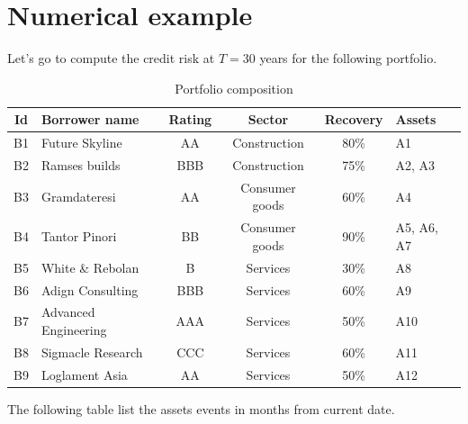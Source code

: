 \documentclass[a4paper,12pt,final]{article}
\begin{document}
\section{Numerical example}

Let's go to compute the credit risk at $T=30$ years for the following portfolio.

\begin{table}[!hb]
\begin{center}
\begin{tabular}[]{c|l|c|c|c|l}
Id  & Borrower name        & Rating & Sector         & Recovery & Assets     \\
\hline
B1  & Future Skyline       & AA     & Construction   & 80\%     & A1         \\
B2  & Ramses builds        & BBB    & Construction   & 75\%     & A2, A3     \\
B3  & Gramdateresi         & AA     & Consumer goods & 60\%     & A4         \\
B4  & Tantor Pinori        & BB     & Consumer goods & 90\%     & A5, A6, A7 \\
B5  & White \& Rebolan     & B      & Services       & 30\%     & A8         \\
B6  & Adign Consulting     & BBB    & Services       & 60\%     & A9         \\
B7  & Advanced Engineering & AAA    & Services       & 50\%     & A10        \\
B8  & Sigmacle Research    & CCC    & Services       & 60\%     & A11        \\
B9  & Loglament Asia       & AA     & Services       & 50\%     & A12        \\
\end{tabular}
\caption{Portfolio composition}
\label{example.portfolio}
\end{center}
\end{table}

The following table list the assets events in months from current date.
\end{document}
